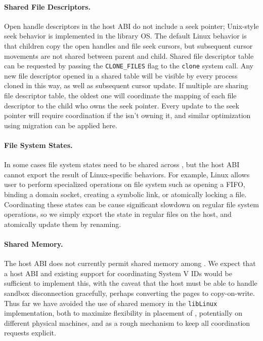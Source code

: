 \paragraph{Shared File Descriptors.} 
Open handle descriptors in the \graphene{} host ABI do not include a seek pointer; 
Unix-style seek behavior is implemented in the library OS.
The default Linux behavior is that children copy the open handles and file seek cursors,
but subsequent cursor movements are not shared between parent and child.
Shared file descriptor table can be requested by passing the {\tt CLONE\_FILES} flag to the {\tt clone} system call.
Any new file descriptor opened in a shared table will be visible by every process cloned in this way, as well as subsequent cursor update.
If multiple \picoprocs{} are sharing file descriptor table,
the oldest one will coordinate the mapping of each file descriptor to the child \picoproc{} who owns the seek pointer.
Every update to the seek pointer will require coordination
if the \picoproc{} isn't owning it,
and similar optimization using migration can be applied here. 

\paragraph{File System States.} 
In some cases file system states need to be shared across \picoprocs{},
but the host ABI cannot export the result of Linux-specific behaviors.
For example, Linux allows user to perform specialized operations on file system
such as opening a FIFO, binding a domain socket, creating a symbolic link,
or atomically locking a file.
Coordinating these states can be cause significant slowdown on regular file system operations, so we simply export the state in regular files on the host,
 and atomically update them by renaming.

\paragraph{Shared Memory.} The \graphene{} host ABI 
does not currently permit shared memory among \picoprocs{}.
We expect that a host ABI and existing support for coordinating System V IDs would be sufficient to implement this,
with the caveat that the host must be able to handle sandbox disconnection gracefully, perhaps converting the pages to copy-on-write.
Thus far we have avoided the use of shared memory in the {\tt libLinux} implementation, both to maximize flexibility in placement of \picoprocs{}, potentially on different physical machines,
and as a rough mechanism to keep all coordination requests explicit.


